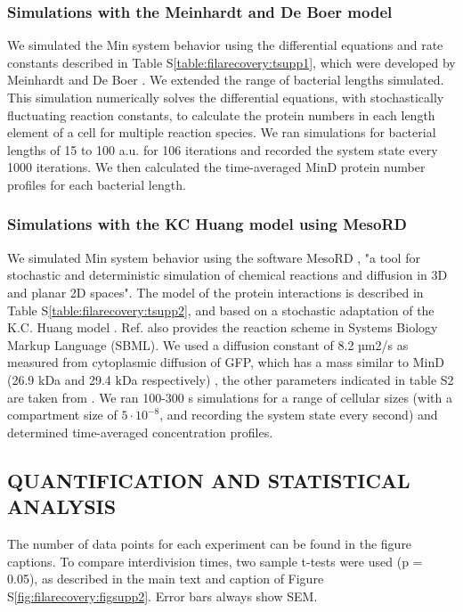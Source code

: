 \subsubsection{Simulations with the Meinhardt and De Boer model}
We simulated the Min system behavior using the differential equations and rate constants described in Table S\ref{table:filarecovery:tsupp1}, which were developed by Meinhardt and De Boer \cite{Meinhardt2001}. We extended the range of bacterial lengths simulated. This simulation numerically solves the differential equations, with stochastically fluctuating reaction constants, to calculate the protein numbers in each length element of a cell for multiple reaction species. We ran simulations for bacterial lengths of 15 to 100 a.u. for 106 iterations and recorded the system state every 1000 iterations. We then calculated the time-averaged MinD protein number profiles for each bacterial length. 

\subsubsection{Simulations with the KC Huang model using MesoRD}
We simulated Min system behavior using the software MesoRD \cite{Hattne2005}, "a tool for stochastic and deterministic simulation of chemical reactions and diffusion in 3D and planar 2D spaces". 
The model of the protein interactions is described in Table S\ref{table:filarecovery:tsupp2}, and based on a stochastic adaptation \cite{Fange2006} of the K.C. Huang model \cite{Huang2003}. Ref.  \cite{Fange2006} also provides the reaction scheme in Systems Biology Markup Language (SBML). 
We used a diffusion constant of 8.2 µm2/s as measured from cytoplasmic diffusion of GFP, which has a mass similar to MinD (26.9 kDa and 29.4 kDa respectively) \cite{Elowitz1999}, the other parameters indicated in table S2 are taken from \cite{Fange2006}. 
We ran 100-300 s simulations for a range of cellular sizes (with a compartment size of $5\cdot10^{-8}$, and recording the system state every second) and determined time-averaged concentration profiles.

\subsection{QUANTIFICATION AND STATISTICAL ANALYSIS}
The number of data points for each experiment can be found in the figure captions. To compare interdivision times, two sample t-tests were used (p = 0.05), as described in the main text and caption of Figure S\ref{fig:filarecovery:figsupp2}. Error bars always show SEM.

